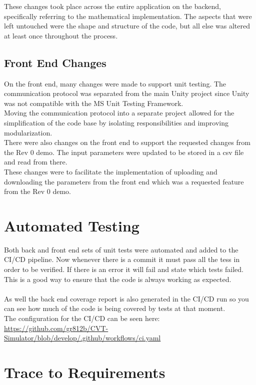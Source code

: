 \documentclass[12pt, titlepage]{article}
\begin{document}
These changes took place across the entire application on the backend, specifically referring to the mathematical implementation. The aspects that were left untouched were the shape and structure of the code, but all else was altered at least once throughout the process. \\

\subsection{Front End Changes}
On the front end, many changes were made to support unit testing. The communication protocol was separated from the main Unity project since Unity was not compatible with the MS Unit Testing Framework.
\\
Moving the communication protocol into a separate project allowed for the simplification of the code base by isolating responsibilities and improving modularization.
\\
There were also changes on the front end to support the requested changes from the Rev 0 demo. The input parameters were updated to be stored in a csv file and read from there.
\\
These changes were to facilitate the implementation of uploading and downloading the parameters from the front end which was a requested feature from the Rev 0 demo.

\section{Automated Testing}
Both back and front end sets of unit tests were automated and added to the CI/CD pipeline. Now whenever there is a commit it must pass all the tess in order to be verified.
If there is an error it will fail and state which tests failed. This is a good way to ensure that the code is always working as expected.\\
\\
As well the back end coverage report is also generated in the CI/CD run so you can see how much of the code is being covered by tests at that moment.
\\
The configuration for the CI/CD can be seen here: \url{https://github.com/gr812b/CVT-Simulator/blob/develop/.github/workflows/ci.yaml}
\section{Trace to Requirements}
\end{document}
